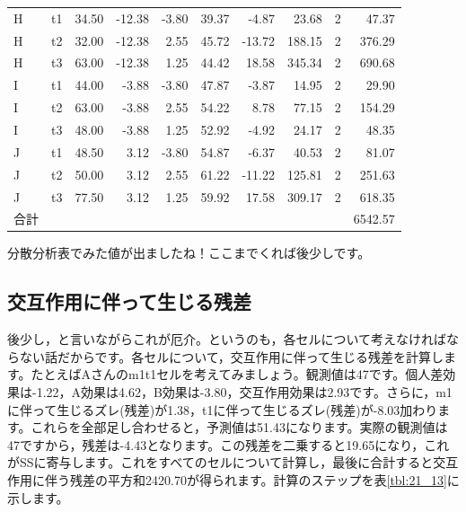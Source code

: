 \documentclass{ltjbook}
\begin{document}
\begin{table}[ht]
\begin{tabular}{llrrrrrrrr}
  H & t1 & 34.50 & -12.38 & -3.80 & 39.37 & -4.87 & 23.68 & 2 & 47.37 \\
  H & t2 & 32.00 & -12.38 & 2.55 & 45.72 & -13.72 & 188.15 & 2 & 376.29 \\
  H & t3 & 63.00 & -12.38 & 1.25 & 44.42 & 18.58 & 345.34 & 2 & 690.68 \\
  I & t1 & 44.00 & -3.88 & -3.80 & 47.87 & -3.87 & 14.95 & 2 & 29.90 \\
  I & t2 & 63.00 & -3.88 & 2.55 & 54.22 & 8.78 & 77.15 & 2 & 154.29 \\
  I & t3 & 48.00 & -3.88 & 1.25 & 52.92 & -4.92 & 24.17 & 2 & 48.35 \\
  J & t1 & 48.50 & 3.12 & -3.80 & 54.87 & -6.37 & 40.53 & 2 & 81.07 \\
  J & t2 & 50.00 & 3.12 & 2.55 & 61.22 & -11.22 & 125.81 & 2 & 251.63 \\
  J & t3 & 77.50 & 3.12 & 1.25 & 59.92 & 17.58 & 309.17 & 2 & 618.35 \\
  \hline
  合計 &  &  &  &  &  &  &  &  & 6542.57 \\
   \hline
\end{tabular}
\end{table}
分散分析表でみた値が出ましたね！ここまでくれば後少しです。

\subsection{交互作用に伴って生じる残差}
後少し，と言いながらこれが厄介。というのも，各セルについて考えなければならない話だからです。各セルについて，交互作用に伴って生じる残差を計算します。たとえばAさんのm1t1セルを考えてみましょう。観測値は47です。個人差効果は-1.22，A効果は4.62，B効果は-3.80，交互作用効果は2.93です。さらに，m1に伴って生じるズレ(残差)が1.38，t1に伴って生じるズレ(残差)が-8.03加わります。これらを全部足し合わせると，予測値は51.43になります。実際の観測値は47ですから，残差は-4.43となります。この残差を二乗すると19.65になり，これがSSに寄与します。これをすべてのセルについて計算し，最後に合計すると交互作用に伴う残差の平方和2420.70が得られます。計算のステップを表\ref{tbl:21_13}に示します。
\end{document}
